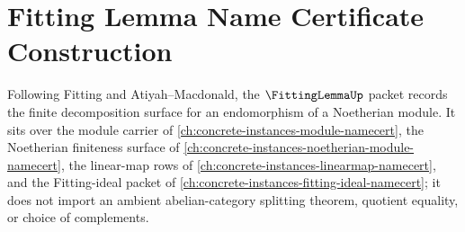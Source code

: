 \chapter{Fitting Lemma Name Certificate Construction}
\label{ch:concrete-instances-fitting-lemma-namecert}

Following Fitting and Atiyah--Macdonald, the $\FittingLemmaUp$ packet records the finite decomposition surface for an endomorphism of a Noetherian module. It sits over the module carrier of \autoref{ch:concrete-instances-module-namecert}, the Noetherian finiteness surface of \autoref{ch:concrete-instances-noetherian-module-namecert}, the linear-map rows of \autoref{ch:concrete-instances-linearmap-namecert}, and the Fitting-ideal packet of \autoref{ch:concrete-instances-fitting-ideal-namecert}; it does not import an ambient abelian-category splitting theorem, quotient equality, or choice of complements.

